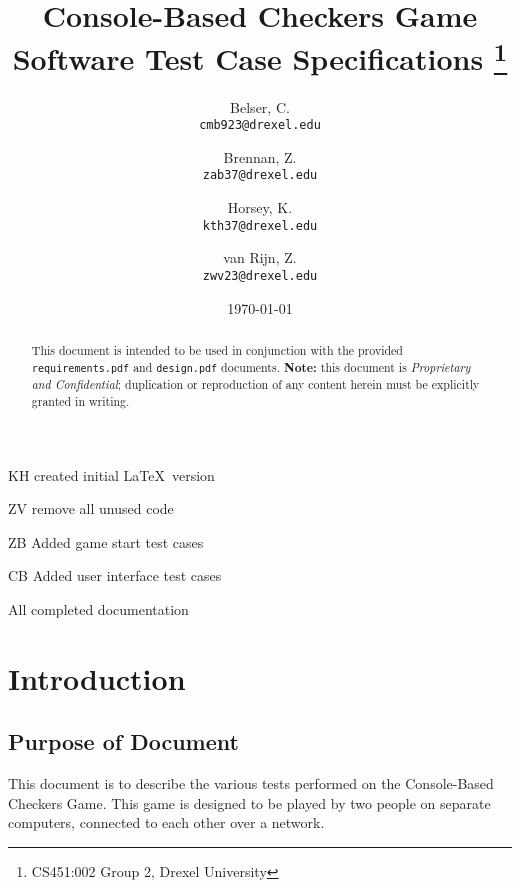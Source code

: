 \documentclass[letterpaper]{article}
\title{
    Console-Based Checkers Game\\
    Software Test Case Specifications
    \footnote{CS451:002 Group 2, Drexel University}
}
\author{
    Belser, C.\\
    \texttt{cmb923@drexel.edu}
    \and
    Brennan, Z.\\
    \texttt{zab37@drexel.edu}
    \and
    Horsey, K.\\
    \texttt{kth37@drexel.edu}
    \and
    van Rijn, Z.\\
    \texttt{zwv23@drexel.edu}
}
\date{\today}
\begin{document}

\maketitle

\begin{abstract}

This document is intended to be used in conjunction with the
provided \texttt{requirements.pdf} and \texttt{design.pdf}
documents. \textbf{Note:} this document is \emph{Proprietary
and Confidential}; duplication or reproduction of any content
herein must be explicitly granted in writing.

\end{abstract}


\tableofcontents
\newpage


\begin{versionhistory}
        {\date{}}
        {KH}
        {created initial \LaTeX~version}
        {\date{}}
        {ZV}
        {remove all unused code}
        {\date{}}
        {ZB}
        {Added game start test cases}    
        {\date{}}
        {CB}
        {Added user interface test cases}
        {\date{}}
        {All}
        {completed documentation}   
\end{versionhistory}
\newpage


\section{Introduction}
\label{sec:intro}

\subsection{Purpose of Document}
\label{sec:intro_outline}

This document is to describe the various tests performed on the
Console-Based Checkers Game. This game is designed to be played
by two people on separate computers, connected to each other
over a network.
\end{document}
